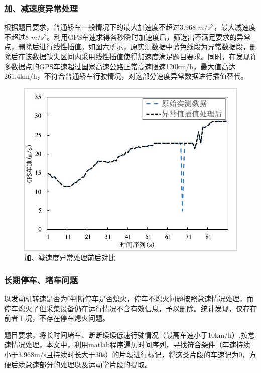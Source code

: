\documentclass[bwprint]{gmcmthesis}
\begin{document}
\subsubsection{加、减速度异常处理}
根据题目要求，普通轿车一般情况下的最大加速度不超过3.968 $m/s^2$，最大减速度不超过8 $m/s^2$。利用GPS车速求得各秒瞬时加速度后，筛选出不满足要求的异常点，删除后进行线性插值。如图六所示，原实测数据中蓝色线段为异常数据段，删除后在该数据缺失区间内采用线性插值使得加速度满足题目要求。同时，在发现许多数据点的GPS车速超过国家高速公路正常高速限速120km/h，最大值高达261.4km/h，不符合普通轿车行驶情况，对这部分速度异常数据进行插值替代。
\begin{figure}[htbp] %
\centering
\includegraphics[width=0.9\linewidth,angle=0]{figures/acc.jpg}
\caption{加、减速度异常处理前后对比}
\label{f6}
\end{figure}

\subsubsection{长期停车、堵车问题}
以发动机转速是否为0判断停车是否熄火，停车不熄火问题按照怠速情况处理，而停车熄火了但采集设备仍在运行情况不含有效信息，予以删除。统计发现，仅存在前者工况，不存在停车熄火问题。

题目要求，将长时间堵车、断断续续低速行驶情况（最高车速小于10km/h）,按怠速情况处理，本文中，利用matlab程序遍历时间序列，寻找符合条件（车速持续小于3.968m/s且持续时长大于30s）的片段进行标记，将这类片段的车速记为0，方便后续怠速部分的处理以及运动学片段的提取。
\end{document}
